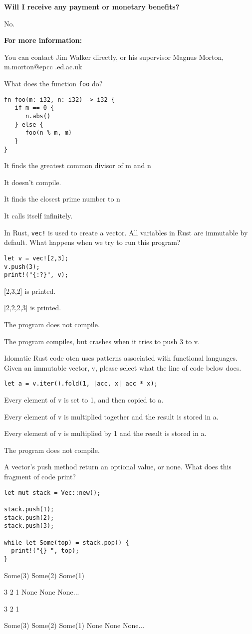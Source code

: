 \documentclass[11pt]{article} %
\newcommand*\choice{\item}
\begin{document}
\noindent\textbf{Will I receive any payment or monetary benefits?}

\noindent No.

\noindent\textbf{For more information:}

\noindent You can contact Jim Walker directly, or his supervisor Magnus Morton, m.morton@epcc .ed.ac.uk
\pagebreak

\begin{multiplechoice}[choices=1]
What does the function \texttt{foo} do?
\begin{lstlisting}
fn foo(m: i32, n: i32) -> i32 {
   if m == 0 {
      n.abs()
   } else {
      foo(n % m, m)
   }
}
\end{lstlisting}
  \choice It finds the greatest common divisor of m and n
  \choice It doesn't compile.
  \choice It finds the closest prime number to n
  \choice It calls itself infinitely.
\end{multiplechoice}

\begin{multiplechoice}[choices=1]
In Rust, \texttt{vec!} is used to create a vector. All variables in Rust are immutable by default. What happens when we try to run this program?
\begin{lstlisting}
let v = vec![2,3];
v.push(3);
print!("{:?}", v);
\end{lstlisting}

\choice {[2,3,2]} is printed.
\choice {[2,2,2,3]} is printed.
\choice The program does not compile.
\choice The program compiles, but crashes when it tries to push 3 to v.

\end{multiplechoice}


\begin{multiplechoice}[choices=1]
Idomatic Rust code oten uses patterns associated with functional languages. Given an immutable vector, v, please select what the line of code below does.
\begin{lstlisting}
let a = v.iter().fold(1, |acc, x| acc * x);
\end{lstlisting}
  \choice Every element of v is set to 1, and then copied to a.
  \choice Every element of v is multiplied together and the result is stored in a.
  \choice Every element of v is multiplied by 1 and the result is stored in a.
  \choice The program does not compile.
\end{multiplechoice}

\begin{multiplechoice}[choices=1]
A vector's push method return an optional value, or none. What does this fragment of code print?
\begin{lstlisting}
let mut stack = Vec::new();

stack.push(1);
stack.push(2);
stack.push(3);

while let Some(top) = stack.pop() {
  print!("{} ", top);
}
\end{lstlisting}
  \choice Some(3) Some(2) Some(1)
  \choice 3 2 1 None None None...
  \choice 3 2 1
  \choice Some(3) Some(2) Some(1) None None None...
\end{multiplechoice}
\end{document}
